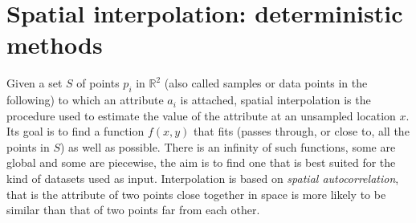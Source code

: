 
\setchapterpreamble[u]{\margintoc}
\chapter{Spatial interpolation: deterministic methods}%
\label{chap:interpol}



\graphicspath{{interpol/}}




Given a set $S$ of points $p_i$ in $\mathbb{R}^2$ (also called samples or data points in the following) to which an attribute $a_i$ is attached, spatial interpolation is the procedure used to estimate the value of the attribute at an unsampled location $x$. 
Its goal is to find a function $f(x,y)$ that fits (passes through, or close to, all the points in $S$) as well as possible. 
There is an infinity of such functions, some are global and some are piecewise, the aim is to find one that is best suited for the kind of datasets used as input.
Interpolation is based on \emph{spatial autocorrelation},%
that is the attribute of two points close together in space is more likely to be similar than that of two points far from each other.

%

